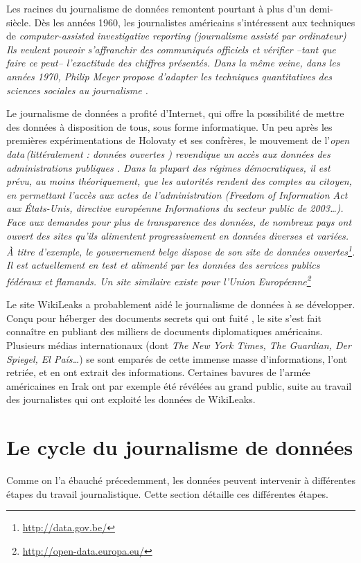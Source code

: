 Les racines du journalisme de données remontent pourtant à plus d'un demi-siècle.
Dès les années 1960, les journalistes américains s'intéressent aux techniques de
\em computer-assisted investigative reporting \em (journalisme assisté par ordinateur)
Ils veulent pouvoir s'affranchir des communiqués officiels et vérifier --tant que
faire ce peut-- l'exactitude des chiffres présentés. Dans la même veine, dans les
années 1970, Philip Meyer propose d'adapter les techniques quantitatives des 
sciences sociales au journalisme \cite{meyer}.

Le journalisme de données a profité d'Internet, qui offre la possibilité de
mettre des données à disposition de tous, sous forme informatique. Un peu après les 
premières expérimentations de Holovaty et ses confrères, le mouvement de 
l'\em open data\em\,(littéralement : \og données ouvertes \fg) revendique un
accès aux données des administrations publiques \cite{bradshaw}. Dans la plupart des régimes 
démocratiques, il est prévu, au moins théoriquement, que les autorités rendent 
des comptes au citoyen, en permettant l'accès aux actes de l'administration
(\em Freedom of Information Act\em\,aux États-Unis, directive européenne \og Informations du secteur public \fg de 2003\dots).
Face aux demandes pour plus de transparence des données, de nombreux pays ont
ouvert des sites qu'ils alimentent progressivement en données diverses et variées.
À titre d'exemple, le gouvernement belge dispose de son site de données ouvertes\footnote{\url{http://data.gov.be/}}. Il est actuellement en test et alimenté par les données des services publics fédéraux et flamands. Un site similaire existe pour l'Union Européenne\footnote{\url{http://open-data.europa.eu/}}

Le site WikiLeaks a probablement aidé le journalisme de données à se développer.
Conçu pour héberger des documents secrets qui ont \og fuité \fg, le site
s'est fait connaître en publiant des milliers de documents diplomatiques américains.
Plusieurs médias internationaux (dont \textit{The New York Times, The Guardian, Der Spiegel, El País\dots}) se sont emparés de cette immense masse d'informations, l'ont
retriée, et en ont extrait des informations. Certaines bavures de l'armée américaines
en Irak ont par exemple été révélées au grand public, suite au travail des 
journalistes qui ont exploité les données de WikiLeaks.


\section{Le cycle du journalisme de données}
Comme on l'a ébauché précedemment, les données peuvent intervenir à différentes
étapes du travail journalistique. Cette section détaille ces différentes étapes.

